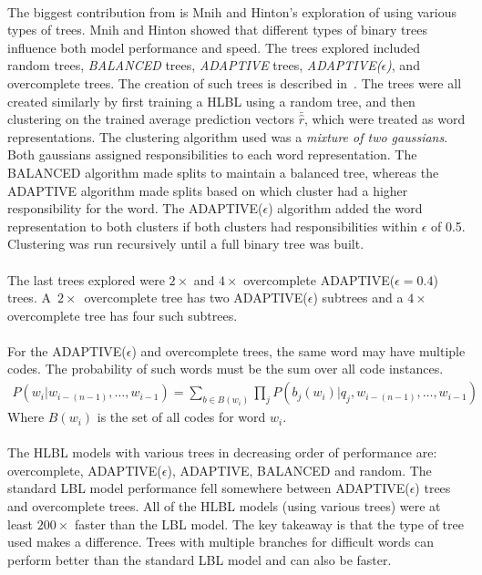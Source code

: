 \paragraph{}
The biggest contribution from \cite{MnihHinton2009} is  Mnih and Hinton's exploration of using various types of trees. Mnih and Hinton showed that different types of binary trees influence both model performance and speed. The trees explored included random trees, \emph{BALANCED} trees, \emph{ADAPTIVE} trees, \emph{ADAPTIVE($\epsilon$)}, and overcomplete trees. The creation of such trees is described in~\cite{MnihHinton2009}.
The trees were all created similarly by first training a HLBL using a random tree, and then clustering on the trained average prediction vectors $\bar{\hat{r}}$, which were treated as word representations. The clustering algorithm used was a \emph{mixture of two gaussians}. Both gaussians assigned responsibilities to each word representation. The BALANCED algorithm made splits to maintain a balanced tree, whereas the ADAPTIVE algorithm made splits based on which cluster had a higher responsibility for the word. The ADAPTIVE($\epsilon$) algorithm added the word representation to both clusters if both clusters had responsibilities within $\epsilon$ of 0.5. Clustering was run recursively until a full binary tree was built. 

\paragraph{}
The last trees explored were $2\times$ and $4\times$ overcomplete ADAPTIVE($\epsilon=0.4$) trees. A~$2\times$~overcomplete tree has two ADAPTIVE($\epsilon$) subtrees and a $4\times$ overcomplete tree has four such subtrees. 

\paragraph{}
For the ADAPTIVE($\epsilon$) and overcomplete trees, the same word may have multiple codes. The probability of such words must be the sum over all code instances.
\begin{align}
P(w_i | w_{i-(n-1)},\dots, w_{i-1}) = \sum_{b \in B(w_i)} \prod_j P(b_j(w_i) | q_j, w_{i-(n-1)},\dots, w_{i-1})
\end{align}
Where $B(w_i)$ is the set of all codes for word $w_i$.

\paragraph{}
The HLBL models with various trees in decreasing order of performance are: overcomplete, ADAPTIVE($\epsilon$), ADAPTIVE, BALANCED and random. The standard LBL model performance fell somewhere between ADAPTIVE($\epsilon$) trees and overcomplete trees. All of the HLBL models (using various trees) were at least $200\times$ faster than the LBL model. 
The key takeaway is that the type of tree used makes a difference. Trees with multiple branches for difficult words can perform better than the standard LBL model and can also be faster.


